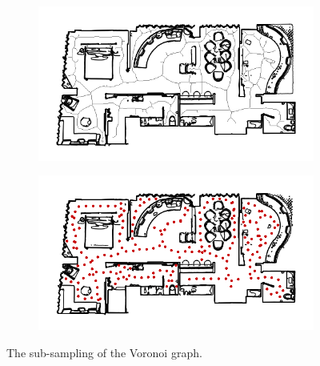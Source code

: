 \begin{figure}[h!]
	\centering
	\begin{subfigure}[b]{0.49\linewidth}
		\centering
		\includegraphics[width=\textwidth]{images/pose_estimator_skelethon_map.png}
		\caption{}
		\label{fig:pose_estimator_voronoi_graph}
	\end{subfigure}
	\hfil
	\begin{subfigure}[b]{0.49\linewidth}
		\centering
		\includegraphics[width=\textwidth]{images/pose_estimator_subsampled.png}
		\caption{}
		\label{fig:pose_estimator_subsampled}
	\end{subfigure}
	\caption{The sub-sampling of the Voronoi graph.}
\end{figure}

